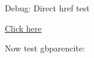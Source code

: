 \documentclass{article}
\begin{document}
Debug: Direct href test

\href{https://books.google.com/books?id=ABC&pg=PA312}{Click here}

Now test gbparencite:

\end{document}
